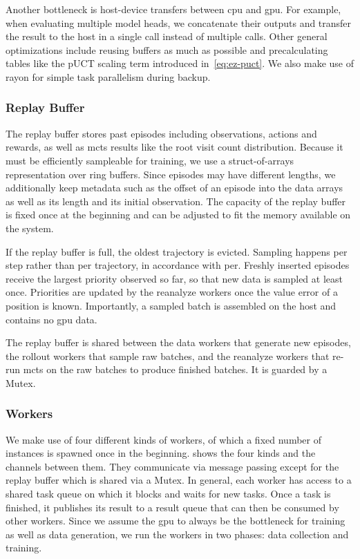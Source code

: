Another bottleneck is host-device transfers between \gls{cpu} and \gls{gpu}.
For example, when evaluating multiple model heads, we concatenate their outputs
and transfer the result to the host in a single call instead of multiple calls.
Other general optimizations include reusing buffers as much as possible and precalculating
tables like the pUCT scaling term introduced in~\cref{eq:ez-puct}.
We also make use of rayon for simple task parallelism during backup.

\subsubsection{Replay Buffer}

The replay buffer stores past episodes including observations, actions and rewards,
as well as \gls{mcts} results like the root visit count distribution.
Because it must be efficiently sampleable for training, we use a struct-of-arrays representation
over ring buffers.
Since episodes may have different lengths, we additionally keep metadata such
as the offset of an episode into the data arrays as well as its length
and its initial observation.
The capacity of the replay buffer is fixed once at the beginning and can be
adjusted to fit the memory available on the system.

If the replay buffer is full, the oldest trajectory is evicted.
Sampling happens per step rather than per trajectory, in accordance with \gls{per}.
Freshly inserted episodes receive the largest priority observed so far, so that new data is
sampled at least once.
Priorities are updated by the reanalyze workers once the value error of a position is known.
Importantly, a sampled batch is assembled on the host and contains no \gls{gpu} data.

The replay buffer is shared between the data workers that generate new
episodes, the rollout workers that sample raw batches, and the reanalyze
workers that re-run \gls{mcts} on the raw batches to produce finished batches.
It is guarded by a Mutex.

\subsubsection{Workers}

We make use of four different kinds of workers, of which a fixed number of instances
is spawned once in the beginning.
 shows the four kinds and the channels between them.
They communicate via message passing except for the replay buffer which is shared via a Mutex.
In general, each worker has access to a shared task queue on which it blocks and waits for
new tasks.
Once a task is finished, it publishes its result to a result queue that can then be consumed by other workers.
Since we assume the \gls{gpu} to always be the bottleneck for training as well as data generation,
we run the workers in two phases: data collection and training.

